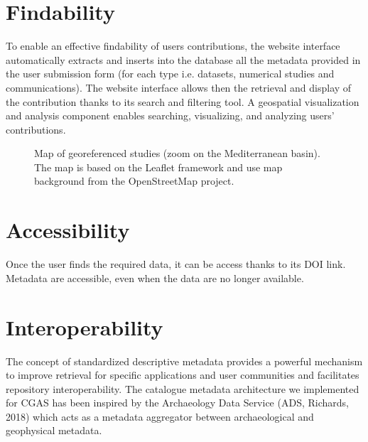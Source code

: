 \documentclass[letterpaper,10pt,english]{sphinxmanual}
\begin{document}
\section{Findability}
\label{\detokenize{FAIR:findability}}
To enable an effective findability of users contributions, the website interface automatically extracts and inserts into the database all the metadata provided in the user submission form (for each type i.e. datasets, numerical studies and communications). The website interface allows then the retrieval and display of the contribution thanks to its search and filtering tool. A geospatial visualization and analysis component enables searching, visualizing, and analyzing users’ contributions.

\begin{figure}[htbp]
\centering
\capstart

\noindent{}
\caption{Map of georeferenced studies (zoom on the Mediterranean basin). The map is based on the Leaflet framework and use map background from the OpenStreetMap project.}\label{\detokenize{FAIR:id1}}\label{\detokenize{FAIR:importing}}\end{figure}


\section{Accessibility}
\label{\detokenize{FAIR:accessibility}}
Once the user finds the required data, it can be access thanks to its DOI link. Metadata are accessible, even when the data are no longer available.


\section{Interoperability}
\label{\detokenize{FAIR:interoperability}}
The concept of standardized descriptive metadata provides a powerful mechanism to improve retrieval for specific applications and user communities and facilitates repository interoperability. The catalogue metadata architecture we implemented for CGAS has been inspired by the Archaeology Data Service (ADS, Richards, 2018) which acts as a metadata aggregator between archaeological and geophysical metadata.
\end{document}
